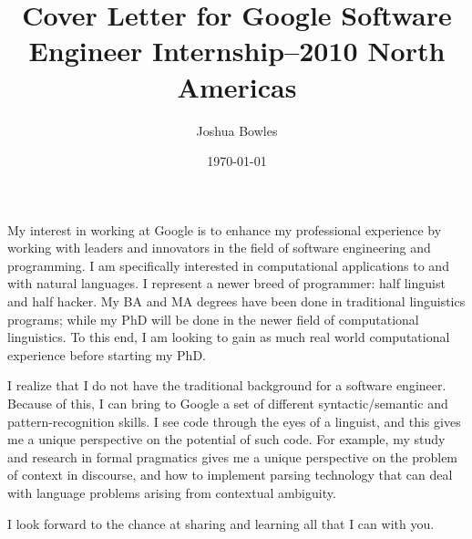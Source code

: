 \documentclass[a4paper,10pt]{article}
\title{Cover Letter for Google Software Engineer Internship--2010 North Americas}
\author{Joshua Bowles}
\date{\today}
\begin{document}
\maketitle

My interest in working at Google is to enhance my professional experience by working with leaders and innovators in the field of software engineering and programming. I am specifically interested in computational applications to and with natural languages. I represent a newer breed of programmer: half linguist and half hacker. My BA and MA degrees have been done in traditional linguistics programs; while my PhD will be done in the newer field of computational linguistics. To this end, I am looking to gain as much real world computational experience before starting my PhD.

I realize that I do not have the traditional background for a software engineer. Because of this, I can bring to Google a set of different syntactic/semantic and pattern-recognition skills. I see code through the eyes of a linguist, and this gives me a unique perspective on the potential of such code. For example, my study and research in formal pragmatics gives me a unique perspective on the problem of context in discourse, and how to implement parsing technology that can deal with language problems arising from contextual ambiguity. 

I look forward to the chance at sharing and learning all that I can with you. 
\end{document}
